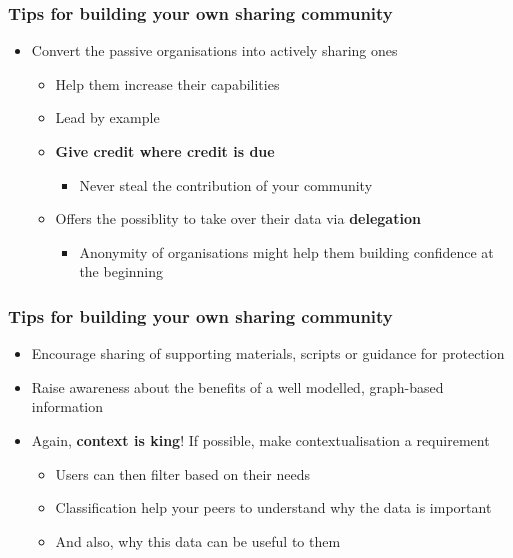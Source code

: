 \begin{frame}
    \frametitle{Tips for building your own sharing community}
    \begin{itemize}
        \item Convert the passive organisations into actively sharing ones
        \begin{itemize}
            \item Help them increase their capabilities
            \item Lead by example
            \item \textbf{Give credit where credit is due}
            \begin{itemize}
                \item Never steal the contribution of your community
            \end{itemize}
            \item Offers the possiblity to take over their data via \textbf{delegation}
            \begin{itemize}
                \item Anonymity of organisations might help them building confidence at the beginning
            \end{itemize}
        \end{itemize}
    \end{itemize}
\end{frame}

\begin{frame}
    \frametitle{Tips for building your own sharing community}
    \begin{itemize}
        \item Encourage sharing of supporting materials, scripts or guidance for protection
        \item Raise awareness about the benefits of a well modelled, graph-based information
        \item Again, \textbf{context is king}! If possible, make contextualisation a requirement
        \begin{itemize}
            \item Users can then filter based on their needs
            \item Classification help your peers to understand why the data is important
            \item And also, why this data can be useful to them
        \end{itemize}
    \end{itemize}
\end{frame}

